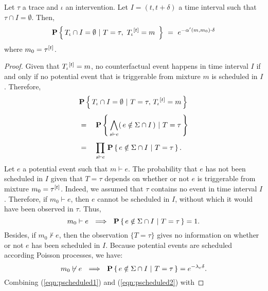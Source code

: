 

\begin{theorem} Let $\tau$ a trace and $\iota$ an intervention. Let
  $I = (t, t+\delta)$ a time interval such that
  $\tau \cap I = \emptyset$. Then,
  \[\mathbf{P} \left\{\,  {T_\iota}{} \cap I = \emptyset  \ |\  T=\tau,\
      {T_\iota}{}^{[t]} = m\  \,\right\}
    \ =\ e^{-\alpha'(m, m_0) \cdot \delta}
  \]
  where $m_0 = \tau^{[t]}$.
\end{theorem}
\begin{proof}

  Given that ${T_\iota}{}^{[t]} = m$, no counterfactual event
  happens in time interval $I$ if and only if no potential event that
  is triggerable from mixture $m$ is scheduled in $I$. Therefore,
  \vskip 0.0cm
  \begin{equation}\label{eqn:scheduled-decomposition}
    \begin{aligned}
      &\mathbf{P} \left\{\,  {T_\iota}{} \cap I = \emptyset  \ |\  T=\tau,\,
        {T_\iota}{}^{[t]} = m  \,\right\}
      \\[0.4em]
      &= \quad \mathbf{P} \left\{\,  \bigwedge_{s \vdash e} (\,e \notin \Sigma \cap
        I \,)  \ |\  T=\tau  \,\right\}
      \\[0.4em]
      &= \quad \prod_{s \vdash e}\, \mathbf{P} \left\{\, e \notin \Sigma \cap I  \ |\ 
        T=\tau  \,\right\}.
    \end{aligned}
  \end{equation}
  \vskip 0.2cm Let $e$ a potential event such that $m \vdash e$. The
  probability that $e$ has not been scheduled in $I$ given that
  $T=\tau$ depends on whether or not $e$ is triggerable from mixture
  $m_0 = \tau^{[t]}$. Indeed, we assumed that $\tau$ contains no
  event in time interval $I$. Therefore, if $m_0 \vdash e$, then $e$
  cannot be scheduled in $I$, without which it would have been
  observed in $\tau$.  Thus,
  \begin{equation}\label{eqn:pscheduled1}
    m_0 \vdash e \ \ \Longrightarrow\ \ \mathbf{P} \left\{\, e \notin \Sigma \cap I \ |\ T=\tau  \,\right\} = 1.
  \end{equation}
  Besides, if $m_0 \not\vdash e$, then the observation $\{ T=\tau \}$
  gives no information on whether or not $e$ has been scheduled in
  $I$. Because potential events are scheduled according Poisson
  processes, we have:
  \begin{equation}\label{eqn:pscheduled2}
    m_0 \not\vdash e \ \ \Longrightarrow\ \ \mathbf{P} \left\{\, e \notin \Sigma \cap I \ |\ 
      T=\tau  \,\right\} = e^{-\lambda_e \delta}.
  \end{equation}
  Combining (\ref{eqn:pscheduled1}) and (\ref{eqn:pscheduled2}) with

\end{proof}
